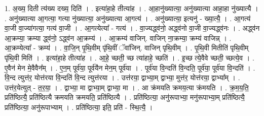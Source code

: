 \documentclass[17pt]{extarticle}
\begin{document}
1. अ॒ख्य॒ दिती त्य॑ख्य दख्य॒ दिति॑ । . इत्या॑हा॒हे तीत्या॑ह । . आ॒हानु॑ख्यात्या॒ अनु॑ख्यात्या आहा॒हा नु॑ख्यात्यै । . अनु॑ख्यात्या आ॒गत्या॒ गत्या नु॑ख्यात्या॒ अनु॑ख्यात्या आ॒गत्य॑ । . अनु॑ख्यात्या॒ इत्यनु॑ - ख्या॒त्यै॒ । . आ॒गत्य॑ वा॒जी वा॒ज्या॑गत्या॒ गत्य॑ वा॒जी । . आ॒गत्येत्या᳚ - गत्य॑ । . वा॒ज्यद्ध्व॑नो॒ अद्ध्व॑नो वा॒जी वा॒ज्यद्ध्व॑नः । . अद्ध्व॑न आ॒क्रम्या॒ क्रम्या द्ध्व॑नो॒ ऽद्ध्व॑न आ॒क्रम्य॑ । . आ॒क्रम्य॑ वाजिन्. वाजिन् ना॒क्रम्या॒ क्रम्य॑ वाजिन्न् । . आ॒क्रम्येत्या᳚ - क्रम्य॑ । . वा॒जि॒न् पृ॒थि॒वीम् पृ॑थि॒वीं ॅवा॑जिन्. वाजिन् पृथि॒वीम् । . पृ॒थि॒वी मितीति॑ पृथि॒वीम् पृ॑थि॒वी मिति॑ । . इत्या॑हा॒हे तीत्या॑ह । . आ॒हे॒ च्छती॒ च्छ त्या॑हाहे॒ च्छति॑ । . इ॒च्छ त्ये॒वैवे च्छती॒ च्छत्ये॒व । . ए॒वैन॑ मेन मे॒वैवैन᳚म् । . ए॒न॒म् पूर्व॑या॒ पूर्व॑यैन मेन॒म् पूर्व॑या । . पूर्व॑या वि॒न्दति॑ वि॒न्दति॒ पूर्व॑या॒ पूर्व॑या वि॒न्दति॑ । . वि॒न्द त्युत्त॑र॒ योत्त॑रया वि॒न्दति॑ वि॒न्द त्युत्त॑रया । . उत्त॑रया॒ द्वाभ्या॒म् द्वाभ्या॒ मुत्त॑र॒ योत्त॑रया॒ द्वाभ्या᳚म् । . उत्त॑र॒येत्युत् - त॒र॒या॒ । . द्वाभ्या॒ मा द्वाभ्या॒म् द्वाभ्या॒ मा । . आ क्र॑मयति क्रमय॒त्या क्र॑मयति । . क्र॒म॒य॒ति॒ प्रति॑ष्ठित्यै॒ प्रति॑ष्ठित्यै क्रमयति क्रमयति॒ प्रति॑ष्ठित्यै । . प्रति॑ष्ठित्या॒ अनु॑रूपाभ्या॒ मनु॑रूपाभ्या॒म् प्रति॑ष्ठित्यै॒ प्रति॑ष्ठित्या॒ अनु॑रूपाभ्याम् । . प्रति॑ष्ठित्या॒ इति॒ प्रति॑ - स्थि॒त्यै॒ । \newline
\end{document}

